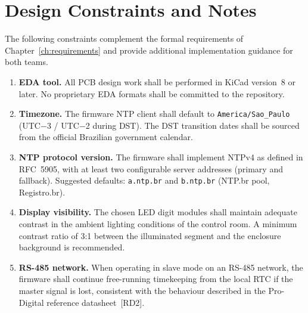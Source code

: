 %
%

\chapter{Design Constraints and Notes} \label{ch:constraints}

The following constraints complement the formal requirements of Chapter~\ref{ch:requirements} and provide additional implementation guidance for both teams.

\begin{enumerate}

    \item \textbf{EDA tool.} All PCB design work shall be performed in KiCad version~8 or later. No proprietary EDA formats shall be committed to the repository.

    \item \textbf{Timezone.} The firmware NTP client shall default to \texttt{America/Sao\_Paulo} (UTC$-$3 / UTC$-$2 during DST). The DST transition dates shall be sourced from the official Brazilian government calendar.

    \item \textbf{NTP protocol version.} The firmware shall implement NTPv4 as defined in RFC~5905, with at least two configurable server addresses (primary and fallback). Suggested defaults: \texttt{a.ntp.br} and \texttt{b.ntp.br} (NTP.br pool, Registro.br).

    \item \textbf{Display visibility.} The chosen LED digit modules shall maintain adequate contrast in the ambient lighting conditions of the control room. A minimum contrast ratio of 3:1 between the illuminated segment and the enclosure background is recommended.

    \item \textbf{RS-485 network.} When operating in slave mode on an RS-485 network, the firmware shall continue free-running timekeeping from the local RTC if the master signal is lost, consistent with the behaviour described in the Pro-Digital reference datasheet~[RD2].

\end{enumerate}
